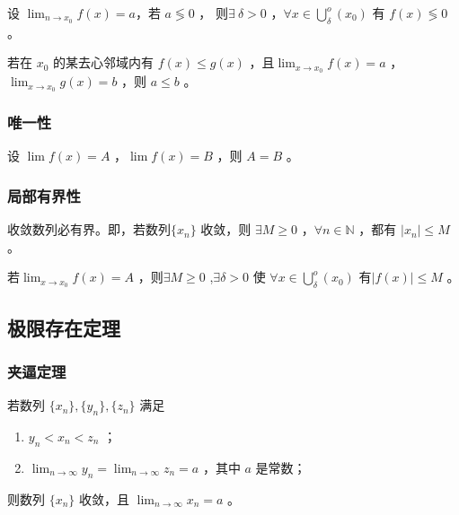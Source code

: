 \begin{Infer}[\ ]

    设 $ \displaystyle\lim_{n\rightarrow x_0}f(x)=a $，若 $ a \lessgtr 0 $ ，
    则$ \exists\ \delta>0 $ ，$ \forall x\in \bigcup\limits^o_\delta(x_0)$ 有 $ f(x)\lessgtr0 $ 。
\end{Infer}

\begin{Theo}[\ ]

    若在 $ x_0 $ 的某去心邻域内有 $ f(x)\leq g(x) $ ，且$ \displaystyle\lim_{x\rightarrow x_0}f(x)=a $ ，
    $ \displaystyle\lim_{x\rightarrow x_0}g(x)=b $ ，则 $ a\leq b $ 。
\end{Theo}

\subsubsection{唯一性}

\begin{Theo}[唯一性]

    设 $ \displaystyle\lim f(x)=A $ ，$ \lim f(x)=B $ ，则 $ A=B $ 。    
\end{Theo}

\subsubsection{局部有界性}

\begin{Theo}[\ ]

    收敛数列必有界。即，若数列$ \{x_n\} $ 收敛，则 $ \exists M\geq0 $ ，$ \forall n\in\mathbb{N} $ ，都有 $ |x_n|\leq M $ 。
\end{Theo}

\begin{Theo}[\ ]

    若$ \displaystyle\lim_{x\rightarrow x_0}f(x)=A $ ，则$ \exists M\geq 0 $ ,$ \exists \delta>0 $ 使
    $ \forall x\in\bigcup\limits^o_\delta(x_0) $ 有$ |f(x)|\leq M $ 。
\end{Theo}


\subsection{极限存在定理}

\subsubsection{夹逼定理}

\begin{Theo}[夹逼定理]

    若数列 $ \{x_n\},\{y_{n}\},\{z_{n}\} $ 满足
    \begin{enumerate}
        \item $ y_{n}<x_{n}<z_{n} $ ；
        \item $ \displaystyle\lim_{n\rightarrow\infty}y_n=\displaystyle\lim_{n\rightarrow\infty}z_n=a $ ，其中 $ a $ 是常数；
    \end{enumerate}
    则数列 $ \{x_n\} $ 收敛，且 $ \displaystyle\lim_{n\rightarrow\infty}x_n=a $ 。
\end{Theo}

